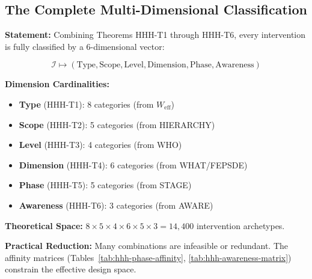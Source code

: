 \subsection{The Complete Multi-Dimensional Classification}
\label{sec:hhh-complete}

\begin{tcolorbox}[colback=green!5!white, colframe=green!75!black,
    title=\textbf{Theorem HHH-T7: Complete Intervention Classification Space}]

\textbf{Statement:} Combining Theorems HHH-T1 through HHH-T6, every intervention is fully classified by a 6-dimensional vector:

\begin{equation}
\boxed{\mathcal{I} \mapsto (\text{Type}, \text{Scope}, \text{Level}, \text{Dimension}, \text{Phase}, \text{Awareness})}
\label{eq:hhh-6d-classification}
\end{equation}

\textbf{Dimension Cardinalities:}
\begin{itemize}[nosep]
    \item \textbf{Type} (HHH-T1): 8 categories (from $W_{\text{eff}}$)
    \item \textbf{Scope} (HHH-T2): 5 categories (from HIERARCHY)
    \item \textbf{Level} (HHH-T3): 4 categories (from WHO)
    \item \textbf{Dimension} (HHH-T4): 6 categories (from WHAT/FEPSDE)
    \item \textbf{Phase} (HHH-T5): 5 categories (from STAGE)
    \item \textbf{Awareness} (HHH-T6): 3 categories (from AWARE)
\end{itemize}

\textbf{Theoretical Space:} $8 \times 5 \times 4 \times 6 \times 5 \times 3 = 14{,}400$ intervention archetypes.

\textbf{Practical Reduction:} Many combinations are infeasible or redundant. The affinity matrices (Tables~\ref{tab:hhh-phase-affinity}, \ref{tab:hhh-awareness-matrix}) constrain the effective design space.

\end{tcolorbox}

